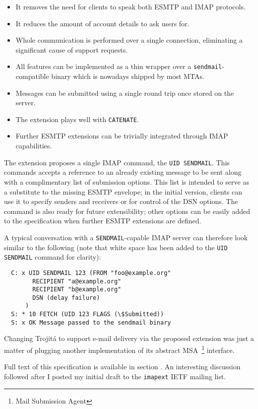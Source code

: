 \documentclass[trojita]{subfiles}
\begin{document}
\begin{itemize}
  \item It removes the need for clients to speak both ESMTP and IMAP protocols.
  \item It reduces the amount of account details to ask users for.
  \item Whole communication is performed over a single connection, eliminating a significant cause of support requests.
  \item All features can be implemented as a thin wrapper over a {\tt sendmail}-compatible binary which is nowadays
    shipped by most MTAs.
  \item Messages can be submitted using a single round trip once stored on the server.
  \item The extension plays well with {\tt CATENATE}.
  \item Further ESMTP extensions can be trivially integrated through IMAP capabilities.
\end{itemize}

The extension proposes a single IMAP command, the {\tt UID SENDMAIL}.  This commands accepts a reference to an already
existing message to be sent along with a complimentary list of submission options.  This list is intended to serve as a
substitute to the missing ESMTP envelope; in the initial version, clients can use it to specify senders and receivers or
for control of the DSN options.  The command is also ready for future extensibility; other options can be easily added
to the specification when further ESMTP extensions are defined.

A typical conversation with a {\tt SENDMAIL}-capable IMAP server can therefore look similar to the following (note that
white space has been added to the {\tt UID SENDMAIL} command for clarity):

\begin{verbatim}
  C: x UID SENDMAIL 123 (FROM "foo@example.org"
        RECIPIENT "a@example.org"
        RECIPIENT "b@example.org"
        DSN (delay failure)
      )
  S: * 10 FETCH (UID 123 FLAGS (\$Submitted))
  S: x OK Message passed to the sendmail binary
\end{verbatim}

Changing Trojitá to support e-mail delivery via the proposed extension was just a matter of plugging another
implementation of its abstract MSA~\footnote{Mail Submission Agent} interface.

Full text of this specification is available in section .  An interesting discussion
followed \cite{jkt-i-p-draft-sendmail} after I posted my initial draft to the {\tt imapext} IETF mailing list.
\end{document}
